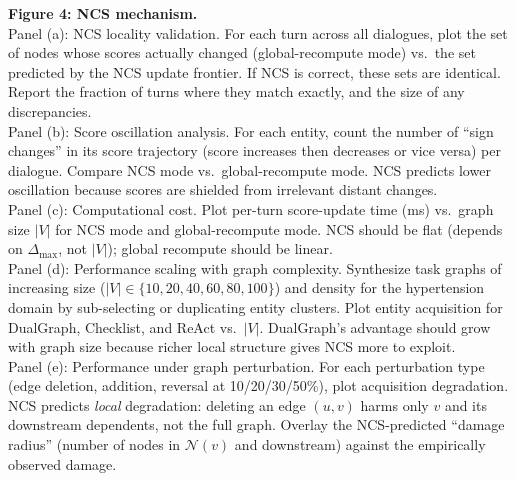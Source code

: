 \documentclass[11pt,a4paper]{article}
\newcommand{\placeholder}[1]{%
  \begin{tcolorbox}[colback=yellow!10,colframe=orange!60!black,
    fonttitle=\bfseries,title=Placeholder]
    #1
  \end{tcolorbox}%
}
\begin{document}
\placeholder{%
  \textbf{Figure 4: NCS mechanism.}\\
  Panel (a): NCS locality validation. For each turn across all dialogues,
  plot the set of nodes whose scores actually changed (global-recompute mode)
  vs.\ the set predicted by the NCS update frontier. If NCS is correct,
  these sets are identical. Report the fraction of turns where they match
  exactly, and the size of any discrepancies.\\
  Panel (b): Score oscillation analysis. For each entity, count the number
  of ``sign changes'' in its score trajectory (score increases then
  decreases or vice versa) per dialogue. Compare NCS mode vs.\
  global-recompute mode. NCS predicts lower oscillation because scores
  are shielded from irrelevant distant changes.\\
  Panel (c): Computational cost. Plot per-turn score-update time (ms) vs.\
  graph size $|V|$ for NCS mode and global-recompute mode. NCS should be
  flat (depends on $\Delta_{\max}$, not $|V|$); global recompute should
  be linear.\\
  Panel (d): Performance scaling with graph complexity. Synthesize task
  graphs of increasing size ($|V| \in \{10, 20, 40, 60, 80, 100\}$) and
  density for the hypertension domain by sub-selecting or duplicating
  entity clusters. Plot entity acquisition for DualGraph, Checklist, and
  ReAct vs.\ $|V|$. DualGraph's advantage should grow with graph size
  because richer local structure gives NCS more to exploit.\\
  Panel (e): Performance under graph perturbation. For each perturbation
  type (edge deletion, addition, reversal at 10/20/30/50\%), plot
  acquisition degradation. NCS predicts \emph{local} degradation: deleting
  an edge $(u,v)$ harms only $v$ and its downstream dependents, not the
  full graph. Overlay the NCS-predicted ``damage radius'' (number of nodes
  in $\mathcal{N}(v)$ and downstream) against the empirically observed
  damage.
}

\begin{table}[!htbp]
\centering
\caption{NCS validation: locality, oscillation, and computational cost.
Hypertension domain, [N] cases. ``Match rate'' is the fraction of turns
where the NCS-predicted update set exactly equals the empirically changed
score set.}
\label{tab:ncs_validation}
\small

\end{table}
\end{document}

